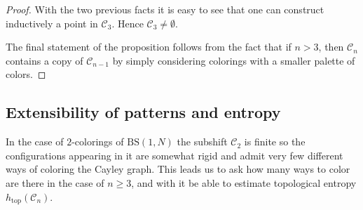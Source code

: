 \documentclass[letterpaper,10pt]{article}
\theoremstyle{plain}
\newcommand{\BS}[1][N]{\mathrm{BS}(1,#1)}
\def\htop{h_{\mathrm{top}}}
\begin{document}
\begin{proof}
	
	With the two previous facts it is easy to see that one can construct inductively a point in $\mathcal{C}_3$. Hence $\mathcal{C}_3\neq \emptyset$.


	The final statement of the proposition follows from the fact that if $n> 3$, then $\mathcal{C}_n$ contains a copy of $\mathcal{C}_{n-1}$ by simply considering colorings with a smaller palette of colors.
\end{proof}

	\subsection{Extensibility of patterns and entropy}\label{subsection.extensibility_patterns}
	In the case of $2$-colorings of $\BS$ the subshift $\mathcal{C}_2$ is finite so the configurations appearing in it are somewhat rigid and admit very few different ways of coloring the Cayley graph. This leads us to ask how many ways to color are there in the case of $n\ge 3$, and with it be able to estimate topological entropy $\htop(\mathcal{C}_n)$.
	
\end{document}
